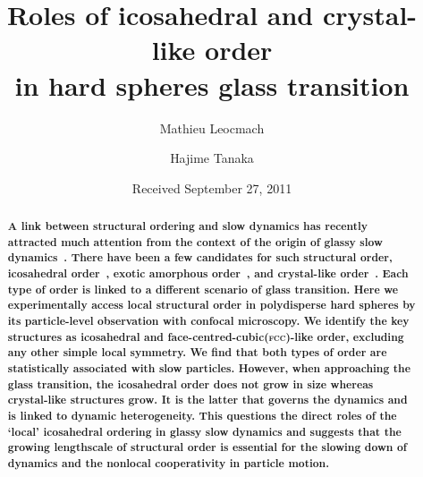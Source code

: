 

\usepackage{xr}



\title{Roles of icosahedral and crystal-like order \\ in hard spheres glass transition} 


\author{Mathieu Leocmach} 

\author{Hajime Tanaka}

\date{Received September 27, 2011}

\begin{abstract}
\textbf{
A link between structural ordering and slow dynamics has recently attracted much attention from the context of the origin of glassy slow dynamics~\citep{cavagna2009supercooled,BerthierR}. There have been a few candidates for such structural order, icosahedral order~\cite{steinhardt1983boo,sadoc1999geometrical, tarjus2005fba}, exotic amorphous order~\cite{lubchenko2007}, and crystal-like order~\cite{tanaka2010critical}. Each type of order is linked to a different scenario of glass transition. Here we experimentally access local structural order in polydisperse hard spheres by its particle-level observation with confocal microscopy. We identify the key structures as icosahedral and face-centred-cubic(\textmd{\textsc{fcc}})-like order, excluding any other simple local symmetry. We find that both types of order are statistically associated with slow particles. However, when approaching the glass transition, the icosahedral order does not grow in size whereas crystal-like structures grow. It is the latter that governs the dynamics and is linked to dynamic heterogeneity. This questions the direct roles of the `local' icosahedral ordering in glassy slow dynamics and suggests that the growing lengthscale of structural order is essential for the slowing down of dynamics and the nonlocal cooperativity in particle motion. 
}
\end{abstract}
\maketitle



